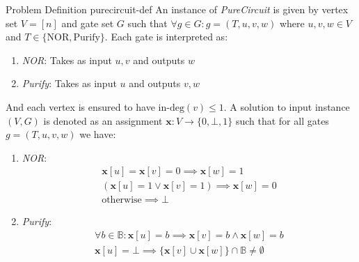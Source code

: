 \begin{definitionbox}{ Problem Definition \cite{deligkas_PureCircuitTightInapproximability_2024}}{purecircuit-def}
    An instance of \textit{PureCircuit} is given by vertex set $V= [n]$ and gate set $G$ such that
    $\forall g \in G: g=(T,u,v,w)$ where $u,v,w \in V$ and $T \in \{\text{NOR}, \text{Purify}\}$.
    Each gate is interpreted as:
    \begin{enumerate}
        \item \textit{NOR}: Takes as input $u,v$ and outputs $w$
        \item \textit{Purify}: Takes as input $u$ and outputs $v,w$
    \end{enumerate}
    And each vertex is ensured to have $\text{in-deg}(v) \leq 1$.
    A solution to input instance $(V,G)$ is denoted as an assignment $\mathbf{x} : V \to \{0, \bot, 1\}$
    such that for all gates $g = (T,u,v,w)$ we have:
    \begin{enumerate}
        \item \textit{NOR}:
              \begin{gather*}
                  \mathbf{x}[u] = \mathbf{x}[v] = 0 \implies \mathbf{x}[w] = 1\\
                  (\mathbf{x}[u] =1 \vee \mathbf{x}[v] =1) \implies \mathbf{x}[w] = 0 \\
                  \text{otherwise} \implies \bot
              \end{gather*}

        \item \textit{Purify}:
              \begin{gather*}
                  \forall b \in \mathbb{B}: \mathbf{x}[u] = b \implies \mathbf{x}[v] = b \wedge \mathbf{x}[w] =  b\\
                  \mathbf{x}[u] = \bot \implies \{\mathbf{x}[v] \cup \mathbf{x}[w] \} \cap \mathbb{B}\neq \emptyset
              \end{gather*}
    \end{enumerate}
\end{definitionbox}

